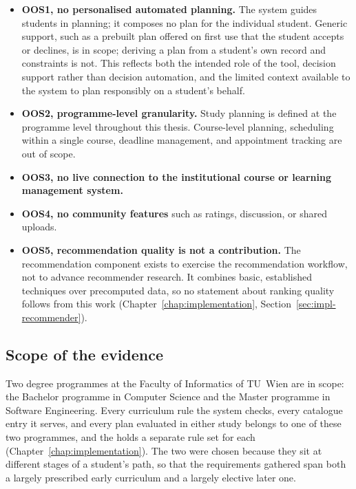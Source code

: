 \begin{itemize}
    \item \textbf{OOS1, no personalised automated planning.} The system guides students in planning; it composes no plan for the individual student. Generic support, such as a prebuilt plan offered on first use that the student accepts or declines, is in scope; deriving a plan from a student's own record and constraints is not. This reflects both the intended role of the tool, decision support rather than decision automation, and the limited context available to the system to plan responsibly on a student's behalf.
    \item \textbf{OOS2, programme-level granularity.} Study planning is defined at the programme level throughout this thesis. Course-level planning, scheduling within a single course, deadline management, and appointment tracking are out of scope.
    \item \textbf{OOS3, no live connection to the institutional course or learning management system.}
    \item \textbf{OOS4, no community features} such as ratings, discussion, or shared uploads.
    \item \textbf{OOS5, recommendation quality is not a contribution.} The recommendation component exists to exercise the recommendation workflow, not to advance recommender research. It combines basic, established techniques over precomputed data, so no statement about ranking quality follows from this work (Chapter~\ref{chap:implementation}, Section~\ref{sec:impl-recommender}).
\end{itemize}

\subsection*{Scope of the evidence}

Two degree programmes at the Faculty of Informatics of TU~Wien are in scope: the Bachelor programme in Computer Science and the Master programme in Software Engineering. Every curriculum rule the system checks, every catalogue entry it serves, and every plan evaluated in either study belongs to one of these two programmes, and the  holds a separate rule set for each (Chapter~\ref{chap:implementation}). The two were chosen because they sit at different stages of a student's path, so that the requirements gathered span both a largely prescribed early curriculum and a largely elective later one.

